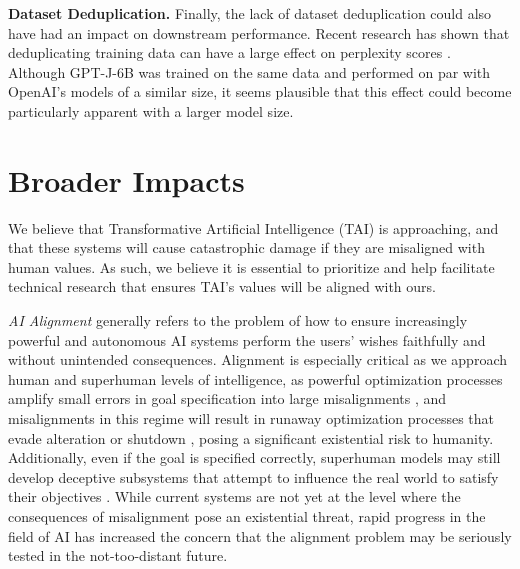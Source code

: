 \documentclass{article}
\begin{document}
\textbf{Dataset Deduplication.} Finally, the lack of dataset deduplication could also have had an impact on downstream performance. Recent research has shown that deduplicating training data can have a large effect on perplexity scores \citep{lee2021deduplicating}. Although GPT-J-6B was trained on the same data and performed on par with OpenAI's models of a similar size, it seems plausible that this effect could become particularly apparent with a larger model size.

\section{Broader Impacts}
\label{sec:broader-impacts}

We believe that Transformative Artificial Intelligence (TAI) \citep{tai} is approaching, and that these systems will cause catastrophic damage if they are misaligned with human values. As such, we believe it is essential to prioritize and help facilitate technical research that ensures TAI's values will be aligned with ours.

\textit{AI Alignment} generally refers to the problem of how to ensure increasingly powerful and autonomous AI systems perform the users' wishes faithfully and without unintended consequences. Alignment is especially critical as we approach human and superhuman levels of intelligence, as powerful optimization processes amplify small errors in goal specification into large misalignments \citep{Goodhart1984,Manheim2019Categorizing_Variants_of_Goodh}, and misalignments in this regime will result in runaway optimization processes that evade alteration or shutdown \citep{Omohundro2008TheBA,BensonTilsen2016FormalizingCI,turner2021optimal}, posing a significant existential risk to humanity. Additionally, even if the goal is specified correctly, superhuman models may still develop deceptive subsystems that attempt to influence the real world to satisfy their objectives \citep{hubinger2021rlo}. While current systems are not yet at the level where the consequences of misalignment pose an existential threat, rapid progress in the field of AI has increased the concern that the alignment problem may be seriously tested in the not-too-distant future.
\end{document}
